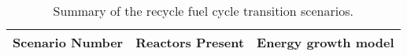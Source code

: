 

\begin{table}[ht]
    \centering
    \caption{Summary of the recycle fuel cycle transition scenarios.}
    \label{tab:scenarios_recycle}
    \begin{tabular}{l l l}
            \hline
            Scenario Number & Reactors Present & Energy growth model\\\hline

            \hline
    \end{tabular}
\end{table}
